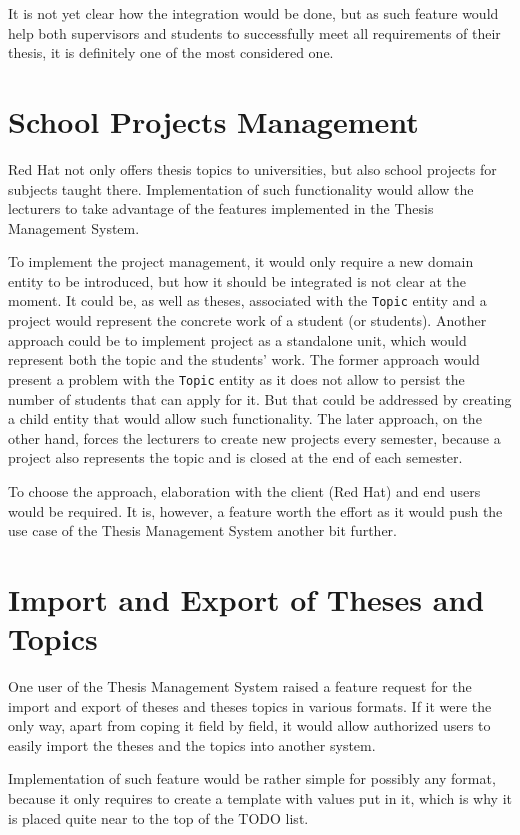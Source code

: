 It is not yet clear how the integration would be done, but as such feature would help both supervisors and students to successfully meet all requirements of their thesis, it is definitely one of the most considered one.

\section{School Projects Management}

Red Hat not only offers thesis topics to universities, but also school projects for subjects taught there. Implementation of such functionality would allow the lecturers to take advantage of the features implemented in the Thesis Management System.

To implement the project management, it would only require a new domain entity to be introduced, but how it should be integrated is not clear at the moment. It could be, as well as theses, associated with the \texttt{Topic} entity and a project would represent the concrete work of a student (or students). Another approach could be to implement project as a standalone unit, which would represent both the topic and the students' work. The former approach would present a problem with the \texttt{Topic} entity as it does not allow to persist the number of students that can apply for it. But that could be addressed by creating a child entity that would allow such functionality. The later approach, on the other hand, forces the lecturers to create new projects every semester, because a project also represents the topic and is closed at the end of each semester.

To choose the approach, elaboration with the client (Red Hat) and end users would be required. It is, however, a feature worth the effort as it would push the use case of the Thesis Management System another bit further.

\section{Import and Export of Theses and Topics}

One user of the Thesis Management System raised a feature request for the import and export of theses and theses topics in various formats. If it were the only way, apart from coping it field by field, it would allow authorized users to easily import the theses and the topics into another system.

Implementation of such feature would be rather simple for possibly any format, because it only requires to create a template with values put in it, which is why it is placed quite near to the top of the TODO list.
